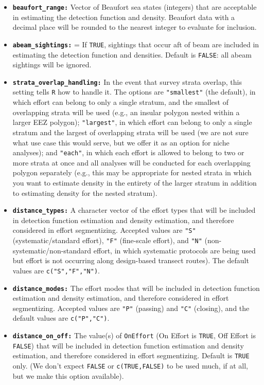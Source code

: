 \documentclass[
]{book}
\begin{document}
\begin{itemize}
\item
  \textbf{\texttt{beaufort\_range:}} Vector of Beaufort sea states (integers) that are acceptable in estimating the detection function and density. Beaufort data with a decimal place will be rounded to the nearest integer to evaluate for inclusion.
\item
  \textbf{\texttt{abeam\_sightings:}} = If \texttt{TRUE}, sightings that occur aft of beam are included in estimating the detection function and densities. Default is \texttt{FALSE}: all abeam sightings will be ignored.
\item
  \textbf{\texttt{strata\_overlap\_handling:}} In the event that survey strata overlap, this setting tells \texttt{R} how to handle it. The options are \texttt{"smallest"} (the default), in which effort can belong to only a single stratum, and the smallest of overlapping strata will be used (e.g., an insular polygon nested within a larger EEZ polygon); \texttt{"largest"}, in which effort can belong to only a single stratum and the largest of overlapping strata will be used (we are not sure what use case this would serve, but we offer it as an option for niche analyses); and \texttt{"each"}, in which each effort is allowed to belong to two or more strata at once and all analyses will be conducted for each overlapping polygon separately (e.g., this may be appropriate for nested strata in which you want to estimate density in the entirety of the larger stratum in addition to estimating density for the nested stratum).
\item
  \textbf{\texttt{distance\_types:}} A character vector of the effort types that will be included in detection function estimation and density estimation, and therefore considered in effort segmentizing. Accepted values are \texttt{"S"} (systematic/standard effort), \texttt{"F"} (fine-scale effort), and \texttt{"N"} (non-systematic/non-standard effort, in which systematic protocols are being used but effort is not occurring along design-based transect routes). The default values are \texttt{c("S","F","N")}.
\item
  \textbf{\texttt{distance\_modes:}} The effort modes that will be included in detection function estimation and density estimation, and therefore considered in effort segmentizing. Accepted values are \texttt{"P"} (passing) and \texttt{"C"} (closing), and the default values are \texttt{c("P","C")}.
\item
  \textbf{\texttt{distance\_on\_off:}} The value(s) of \texttt{OnEffort} (On Effort is \texttt{TRUE}, Off Effort is \texttt{FALSE}) that will be included in detection function estimation and density estimation, and therefore considered in effort segmentizing. Default is \texttt{TRUE} only. (We don't expect \texttt{FALSE} or \texttt{c(TRUE,FALSE)} to be used much, if at all, but we make this option available).
\end{itemize}
\end{document}

